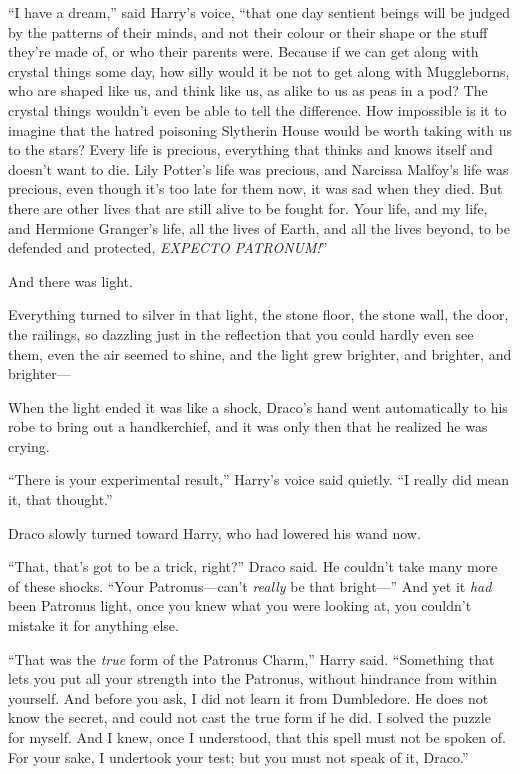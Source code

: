 “I have a dream,” said Harry’s voice, “that one day sentient beings will be judged by the patterns of their minds, and not their colour or their shape or the stuff they’re made of, or who their parents were. Because if we can get along with crystal things some day, how silly would it be not to get along with Muggleborns, who are shaped like us, and think like us, as alike to us as peas in a pod? The crystal things wouldn’t even be able to tell the difference. How impossible is it to imagine that the hatred poisoning Slytherin House would be worth taking with us to the stars? Every life is precious, everything that thinks and knows itself and doesn’t want to die. Lily Potter’s life was precious, and Narcissa Malfoy’s life was precious, even though it’s too late for them now, it was sad when they died. But there are other lives that are still alive to be fought for. Your life, and my life, and Hermione Granger’s life, all the lives of Earth, and all the lives beyond, to be defended and protected, \emph{EXPECTO PATRONUM!}”

And there was light.

Everything turned to silver in that light, the stone floor, the stone wall, the door, the railings, so dazzling just in the reflection that you could hardly even see them, even the air seemed to shine, and the light grew brighter, and brighter, and brighter—

When the light ended it was like a shock, Draco’s hand went automatically to his robe to bring out a handkerchief, and it was only then that he realized he was crying.

“There is your experimental result,” Harry’s voice said quietly. “I really did mean it, that thought.”

Draco slowly turned toward Harry, who had lowered his wand now.

“That, that’s got to be a trick, right?” Draco said. He couldn’t take many more of these shocks. “Your Patronus—can’t \emph{really} be that bright—” And yet it \emph{had} been Patronus light, once you knew what you were looking at, you couldn’t mistake it for anything else.

“That was the \emph{true} form of the Patronus Charm,” Harry said. “Something that lets you put all your strength into the Patronus, without hindrance from within yourself. And before you ask, I did not learn it from Dumbledore. He does not know the secret, and could not cast the true form if he did. I solved the puzzle for myself. And I knew, once I understood, that this spell must not be spoken of. For your sake, I undertook your test; but you must not speak of it, Draco.”

